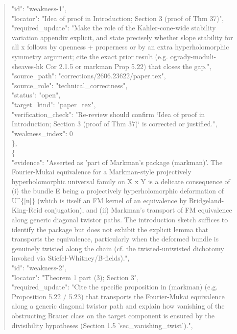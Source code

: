 \documentclass[11pt]{article}
\begin{document}
\begin{quote}
      "id": "weakness-1",\\
      "locator": "Idea of proof in Introduction; Section 3 (proof of Thm 37)",\\
      "required\_update": "Make the role of the Kahler-cone-wide stability variation appendix explicit, and state precisely whether slope stability for all x follows by openness + properness or by an extra hyperholomorphic symmetry argument; cite the exact prior result (e.g. ogrady-moduli-sheaves-hk Cor 2.1.5 or markman Prop 5.22) that closes the gap.",\\
      "source\_path": "corrections/2606.23622/paper.tex",\\
      "source\_role": "technical\_correctness",\\
      "status": "open",\\
      "target\_kind": "paper\_tex",\\
      "verification\_check": "Re-review should confirm `Idea of proof in Introduction; Section 3 (proof of Thm 37)` is corrected or justified.",\\
      "weakness\_index": 0\\
    \},\\
    \{\\
      "evidence": "Asserted as 'part of Markman's package (markman)'. The Fourier-Mukai equivalence for a Markman-style projectively hyperholomorphic universal family on X x Y is a delicate consequence of (i) the bundle E being a projectively hyperholomorphic deformation of U\^{}\{[n]\} (which is itself an FM kernel of an equivalence by Bridgeland-King-Reid conjugation), and (ii) Markman's transport of FM equivalence along generic diagonal twistor paths. The introduction sketch suffices to identify the package but does not exhibit the explicit lemma that transports the equivalence, particularly when the deformed bundle is genuinely twisted along the chain (cf. the twisted-untwisted dichotomy invoked via Stiefel-Whitney/B-fields).",\\
      "id": "weakness-2",\\
      "locator": "Theorem 1 part (3); Section 3",\\
      "required\_update": "Cite the specific proposition in (markman) (e.g. Proposition 5.22 / 5.23) that transports the Fourier-Mukai equivalence along a generic diagonal twistor path and explain how vanishing of the obstructing Brauer class on the target component is ensured by the divisibility hypotheses (Section 1.5 'sec\_vanishing\_twist').",\\

\end{quote}
\end{document}
